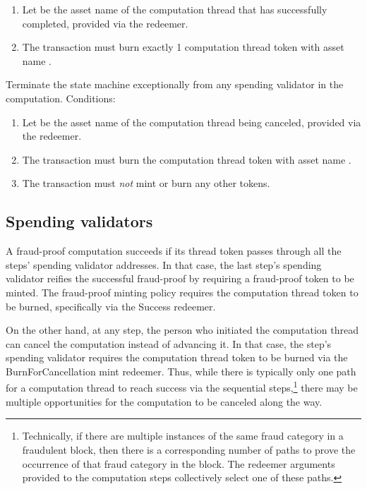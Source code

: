 \documentclass[../midgard.tex]{subfiles}
\begin{document}
\begin{description}
\begin{enumerate}
            \item Let  be the asset name of the computation thread that has successfully completed, provided via the redeemer.
            \item The transaction must burn exactly 1 computation thread token with asset name .
        \end{enumerate}
    \item[BurnForCancellation.] Terminate the state machine exceptionally from any spending validator in the computation.
      Conditions:
        \begin{enumerate}
            \item Let  be the asset name of the computation thread being canceled, provided via the redeemer.
            \item The transaction must burn the computation thread token with asset name .
            \item The transaction must \emph{not} mint or burn any other tokens.
        \end{enumerate}
\end{description}

\subsection{Spending validators}
\label{h:fraud-proof-computation-threads-spending-validators}

A fraud-proof computation succeeds if its thread token passes through all the steps' spending validator addresses.
In that case, the last step's spending validator reifies the successful fraud-proof by requiring a fraud-proof token to be minted.
The fraud-proof minting policy requires the computation thread token to be burned, specifically via the Success redeemer.

On the other hand, at any step, the person who initiated the computation thread can cancel the computation instead of advancing it.
In that case, the step's spending validator requires the computation thread token to be burned via the BurnForCancellation mint redeemer.
Thus, while there is typically only one path for a computation thread to reach success via the sequential steps,\footnote{Technically, if there are multiple instances of the same fraud category in a fraudulent block, then there is a corresponding number of paths to prove the occurrence of that fraud category in the block.
The redeemer arguments provided to the computation steps collectively select one of these paths.} there may be multiple opportunities for the computation to be canceled along the way.
\end{document}
